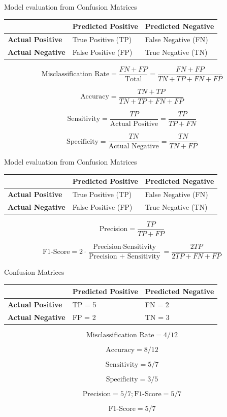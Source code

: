 \documentclass[
  ignorenonframetext,
]{beamer}
\begin{document}
\begin{frame}{Model evaluation from Confusion Matrices}
\protect\hypertarget{model-evaluation-from-confusion-matrices}{}
\begin{longtable}[]{@{}lll@{}}
\toprule
& Predicted Positive & Predicted Negative \\
\midrule
\endhead
\textbf{Actual Positive} & True Positive (TP) & False Negative (FN) \\
\textbf{Actual Negative} & False Positive (FP) & True Negative (TN) \\
\bottomrule
\end{longtable}

\[
\text{Misclassification Rate} =  \frac{FN + FP}{\text{Total}} = \frac{FN + FP}{TN+TP+FN+FP} 
\]

\[
\text{Accuracy} = \frac{TN+TP}{TN+TP+FN+FP} 
\]

\[
\text{Sensitivity} = \frac{TP}{\text{Actual Positive}} = \frac{TP}{TP+FN} 
\]

\[
\text{Specificity} = \frac{TN}{\text{Actual Negative}} = \frac{TN}{TN+FP}
\]
\end{frame}

\begin{frame}{Model evaluation from Confusion Matrices}
\protect\hypertarget{model-evaluation-from-confusion-matrices-1}{}
\begin{longtable}[]{@{}lll@{}}
\toprule
& Predicted Positive & Predicted Negative \\
\midrule
\endhead
\textbf{Actual Positive} & True Positive (TP) & False Negative (FN) \\
\textbf{Actual Negative} & False Positive (FP) & True Negative (TN) \\
\bottomrule
\end{longtable}

\[
\text{Precision} = \frac{TP}{TP+FP} 
\]

\[
\text{F1-Score} =2\cdot  \frac{\text{Precision} \cdot \text{Sensitivity}}{\text{Precision + Sensitivity}} = \frac{2TP}{2TP+FN+FP}
\]
\end{frame}

\begin{frame}{Confusion Matrices}
\protect\hypertarget{confusion-matrices-3}{}
\begin{longtable}[]{@{}lll@{}}
\toprule
& Predicted Positive & Predicted Negative \\
\midrule
\endhead
\textbf{Actual Positive} & TP = 5 & FN = 2 \\
\textbf{Actual Negative} & FP = 2 & TN = 3 \\
\bottomrule
\end{longtable}

\[
\text{Misclassification Rate} =4/12 
\]

\[
\text{Accuracy} = 8/12 
\]

\[
\text{Sensitivity} = 5/7 
\]

\[
\text{Specificity} = 3/5 
\]

\[
\text{Precision} = 5/7; 
\text{F1-Score} = 5/7
\]

\[
\text{F1-Score} = 5/7
\]
\end{frame}
\end{document}
